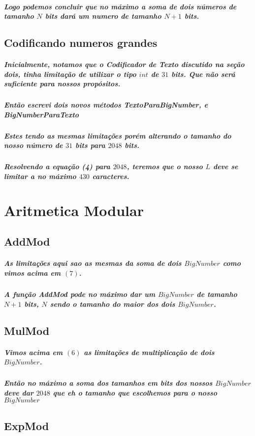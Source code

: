 \documentclass[12pt,twoside, a4paper, twocolumn]{article}
\begin{document}
\subparagraph*{Logo podemos concluir que no máximo a soma de dois números de tamanho $N$ bits dará um numero de tamanho $N+1$ bits.}

\subsection{Codificando numeros grandes}

\subparagraph*{Inicialmente, notamos que o \emph{Codificador de Texto} discutido na seção dois, tinha limitação de utilizar o tipo $int$ de $31$ bits. Que não será suficiente para nossos propósitos. }

\subparagraph*{Então escrevi dois novos métodos \emph{TextoParaBigNumber}, e \emph{BigNumberParaTexto} }

\subparagraph*{Estes tendo as mesmas limitações porém alterando o tamanho do nosso número de $31$ bits para $2048$ bits.}

\subparagraph*{Resolvendo a equação (4) para $2048$, teremos que o nosso $L$ deve se limitar a no máximo $430$ caracteres.}

\section{Aritmetica Modular}

\subsection{AddMod}

\subparagraph*{As limitações aqui sao as mesmas da soma de dois $BigNumber$ como vimos acima em $(7)$. }
\subparagraph*{A função AddMod pode no máximo dar um $BigNumber$ de tamanho $N+1$ bits, $N$ sendo o tamanho do maior dos dois $BigNumber$.}

\subsection{MulMod}

\subparagraph*{Vimos acima em $(6)$ as limitações de multiplicação de dois $BigNumber$.}

\subparagraph*{Então no máximo a soma dos tamanhos em bits dos nossos $BigNumber$ deve dar $2048$ que eh o tamanho que escolhemos para o nosso $BigNumber$}

\subsection{ExpMod}
\end{document}
